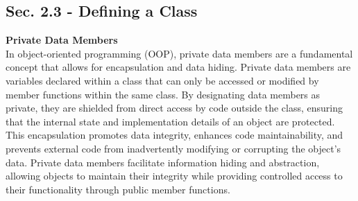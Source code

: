 \subsection{Sec. 2.3 - Defining a Class}
\noindent \textbf{Private Data Members} \\

In object-oriented programming (OOP), private data members are a fundamental concept that allows for encapsulation and data hiding. Private data members are variables declared within a class that can only be accessed or modified by member functions within the same class. 
By designating data members as private, they are shielded from direct access by code outside the class, ensuring that the internal state and implementation details of an object are protected. This encapsulation promotes data integrity, enhances code maintainability, and 
prevents external code from inadvertently modifying or corrupting the object's data. Private data members facilitate information hiding and abstraction, allowing objects to maintain their integrity while providing controlled access to their functionality through public 
member functions. \\

